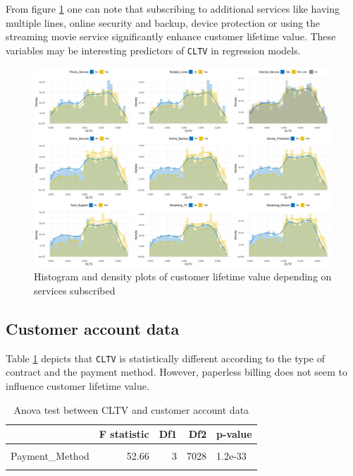 \documentclass[
]{book}
\begin{document}
From figure \ref{fig:cltvservices} one can note that subscribing to additional services like having multiple lines, online security and backup, device protection or using the streaming movie service significantly enhance customer lifetime value. These variables may be interesting predictors of \texttt{CLTV} in regression models.

\begin{figure}

{\centering \includegraphics[width=75in]{./imgs/cltv_services_plots} 

}

\caption{Histogram and density plots of customer lifetime value depending on services subscribed}\label{fig:cltvservices}
\end{figure}

\hypertarget{customer-account-data-1}{%
\subsection*{Customer account data}\label{customer-account-data-1}}

Table \ref{tab:aovaccountinfo} depicts that \texttt{CLTV} is statistically different according to the type of contract and the payment method. However, paperless billing does not seem to influence customer lifetime value.

\begin{table}[H]

\caption{\label{tab:aovaccountinfo}Anova test between CLTV and customer account data}
\centering
\begin{tabular}[t]{lrrrl}
\toprule
  & F statistic & Df1 & Df2 & p-value\\
\midrule
\cellcolor{gray!6}{Contract} & \cellcolor{gray!6}{274.28} & \cellcolor{gray!6}{2} & \cellcolor{gray!6}{7029} & \cellcolor{gray!6}{2e-115}\\
Payment\_Method & 52.66 & 3 & 7028 & 1.2e-33\\
\cellcolor{gray!6}{Paperless\_Billing} & \cellcolor{gray!6}{0.77} & \cellcolor{gray!6}{1} & \cellcolor{gray!6}{7030} & \cellcolor{gray!6}{3.8e-01}\\
\bottomrule
\end{tabular}
\end{table}
\end{document}
